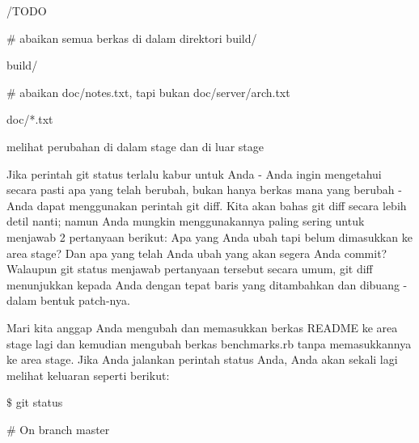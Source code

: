\noindent 
{\fontsize{14pt}{14pt}\selectfont /TODO \\} \par
\noindent 
{\fontsize{14pt}{14pt}\selectfont  $  \#  $ abaikan semua berkas di dalam direktori build/ \\} \par
\noindent 
{\fontsize{14pt}{14pt}\selectfont build/ \\} \par
\noindent 
{\fontsize{14pt}{14pt}\selectfont  $  \#  $ abaikan doc/notes.txt, tapi bukan doc/server/arch.txt \\} \par
\noindent 
{\fontsize{14pt}{14pt}\selectfont doc/*.txt \\} \par
\vspace{14pt}
\noindent 
{\fontsize{14pt}{14pt}\selectfont melihat perubahan di dalam stage dan di luar stage \\} \par
\vspace{14pt}
\noindent 
{\fontsize{14pt}{14pt}\selectfont Jika perintah $  $git status $  $terlalu kabur untuk Anda - Anda ingin mengetahui secara pasti apa yang telah berubah, bukan hanya berkas mana yang berubah - Anda dapat menggunakan perintah $  $git diff. Kita akan bahas $  $git diff $  $secara lebih detil nanti; namun Anda mungkin menggunakannya paling sering untuk menjawab 2 pertanyaan berikut: Apa yang Anda ubah tapi belum dimasukkan ke area stage? Dan apa yang telah Anda ubah yang akan segera Anda commit? Walaupun $  $git status $  $menjawab pertanyaan tersebut secara umum, $  $git diff $  $menunjukkan kepada Anda dengan tepat baris yang ditambahkan dan dibuang - dalam bentuk patch-nya. \\} \par
\noindent 
{\fontsize{14pt}{14pt}\selectfont Mari kita anggap Anda mengubah dan memasukkan berkas README ke area stage lagi dan kemudian mengubah berkas benchmarks.rb tanpa memasukkannya ke area stage. Jika Anda jalankan perintah $  $status $  $Anda, Anda akan sekali lagi melihat keluaran seperti berikut: \\} \par
\vspace{14pt}
\noindent 
{\fontsize{14pt}{14pt}\selectfont  $  \$  $ git status \\} \par
\noindent 
{\fontsize{14pt}{14pt}\selectfont  $  \#  $ On branch master \\} \par
